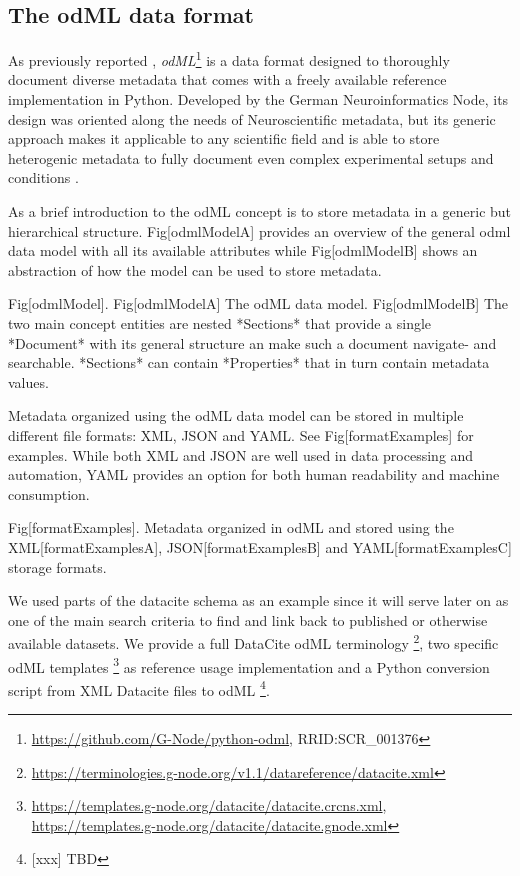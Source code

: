 \documentclass{article}
\begin{document}
\subsection{The odML data format}
As previously reported \cite{Grewe_2011}, \textit{odML}\footnote{\url{https://github.com/G-Node/python-odml}, RRID:SCR\_001376} is a data format designed to thoroughly document diverse metadata that comes with a freely available reference implementation in Python. Developed by the German Neuroinformatics Node, its design was oriented along the needs of Neuroscientific metadata, but its generic approach makes it applicable to any scientific field and is able to store heterogenic metadata to fully document even complex experimental setups and conditions \cite{Zehl_2016}.

As a brief introduction to the odML concept is to store metadata in a generic but hierarchical structure. Fig[odmlModelA] provides an overview of the general odml data model with all its available attributes while Fig[odmlModelB] shows an abstraction of how the model can be used to store metadata.

Fig[odmlModel]. Fig[odmlModelA] The odML data model. Fig[odmlModelB] The two main concept entities are nested *Sections* that provide a single *Document* with its general structure an make such a document navigate- and searchable. *Sections* can contain *Properties* that in turn contain metadata values.

Metadata organized using the odML data model can be stored in multiple different file formats: XML, JSON and YAML. See Fig[formatExamples] for examples. While both XML and JSON are well used in data processing and automation, YAML provides an option for both human readability and machine consumption.

Fig[formatExamples]. Metadata organized in odML and stored using the XML[formatExamplesA], JSON[formatExamplesB] and YAML[formatExamplesC] storage formats.

We used parts of the datacite schema as an example since it will serve later on as one of the main search criteria to find and link back to published or otherwise available datasets. We provide a full DataCite odML terminology \footnote{\url{https://terminologies.g-node.org/v1.1/datareference/datacite.xml}}, two specific odML templates \footnote{\url{https://templates.g-node.org/datacite/datacite.crcns.xml}, \url{https://templates.g-node.org/datacite/datacite.gnode.xml}} as reference usage implementation and a Python conversion script from XML Datacite files to odML \footnote{[xxx] TBD}.
\end{document}

